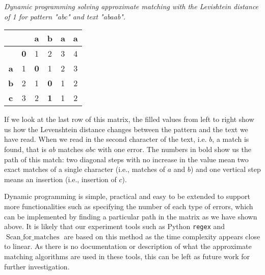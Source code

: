 \begin{example} \emph{Dynamic programming solving approximate matching with the Levishtein distance of 1 for pattern "abc" and text "abaab".}

\begin{table}[H]
	\centering
\begin{tabular}{|c|c|c|c|c|c|}
	\hline
	\multicolumn{1}{|l|}{}            & \multicolumn{1}{l|}{}    & \multicolumn{1}{l|}{\textbf{a}}   & \multicolumn{1}{l|}{\textbf{b}}   & \multicolumn{1}{l|}{\textbf{a}} & \multicolumn{1}{l|}{\textbf{a}} \\ \hline
	& \textbf{0}               & 1                                 & 2                                 & 3                               & 4                               \\ \hline
	\textbf{a}                        & 1                        & {\color[HTML]{000000} \textbf{0}} & 1                                 & {\color[HTML]{333333} 2}        & {\color[HTML]{333333} 3}        \\ \hline
	\textbf{b}                        & 2                        & 1                                 & \textbf{0}                        & {\color[HTML]{333333} 1}        & {\color[HTML]{333333} 2}        \\ \hline
	{\color[HTML]{333333} \textbf{c}} & {\color[HTML]{333333} 3} & {\color[HTML]{333333} 2}          & {\color[HTML]{32CB00} \textbf{1}} & {\color[HTML]{000000} 1}        & {\color[HTML]{333333} 2}        \\ \hline
\end{tabular}
\end{table}
	\label{fig:dynap}
 \end{example}
If we look at the last row of this matrix, the filled values from left to right show us how the Levenshtein distance changes between the pattern and the text we have read. When we read in the second character of the text, i.e. $b$, a match is found, that is $ab$ matches $abc$ with one error. The numbers in bold show us the path of this match: two diagonal steps with no increase in the value mean two exact matches of a single character (i.e., matches of $a$ and $b$) and one vertical step means an insertion (i.e., insertion of $c$). 

Dynamic programming is simple, practical and easy to be extended to support more functionalities such as specifying the number of each type of errors, which can be implemented by finding a particular path in the matrix as we have shown above. It is likely that our experiment tools such as Python {\tt regex} and $\operatorname{Scan\_for\_matches}$ are based on this method as the time complexity appears close to linear. As there is no documentation or description of what the approximate matching algorithms are used in these tools, this can be left as future work for further investigation.


